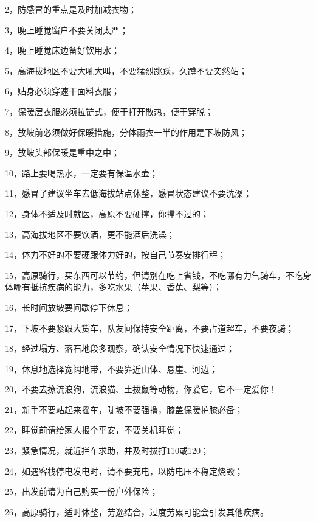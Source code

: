 \documentclass{ctexbook}
\begin{document}
2，防感冒的重点是及时加减衣物；

3，晚上睡觉窗户不要关闭太严；

4，晚上睡觉床边备好饮用水；

5，高海拔地区不要大吼大叫，不要猛烈跳跃，久蹲不要突然站；

6，贴身必须穿速干面料衣服；

7，保暖层衣服必须拉链式，便于打开散热，便于穿脱；

8，放坡前必须做好保暖措施，分体雨衣一半的作用是下坡防风；

9，放坡头部保暖是重中之中；

10，路上要喝热水，一定要有保温水壶；

11，感冒了建议坐车去低海拔站点休整，感冒状态建议不要洗澡；

12，身体不适及时就医，高原不要硬撑，你撑不过的；

13，高海拔地区不要饮酒，更不能酒后洗澡；

14，体力不好的不要硬跟体力好的，按自己节奏安排行程；

15，高原骑行，买东西可以节约，但请别在吃上省钱，不吃哪有力气骑车，不吃身体哪有抵抗疾病的能力，多吃水果（苹果、香蕉、梨等）；

16，长时间放坡要间歇停下休息；

17，下坡不要紧跟大货车，队友间保持安全距离，不要占道超车，不要夜骑；

18，经过塌方、落石地段多观察，确认安全情况下快速通过；

19，休息地选择宽阔地带，不要靠近山体、悬崖、河边；

20，不要去撩流浪狗，流浪猫、土拔鼠等动物，你爱它，它不一定爱你！

21，新手不要站起来摇车，陡坡不要强撸，膝盖保暖护膝必备；

22，睡觉前请给家人报个平安，不要关机睡觉；

23，紧急情况，就近拦车求助，并及时拔打110或120；

24，如遇客栈停电发电时，请不要充电，以防电压不稳定烧毁；

25，出发前请为自己购买一份户外保险；

26，高原骑行，适时休整，劳逸结合，过度劳累可能会引发其他疾病。
\end{document}

